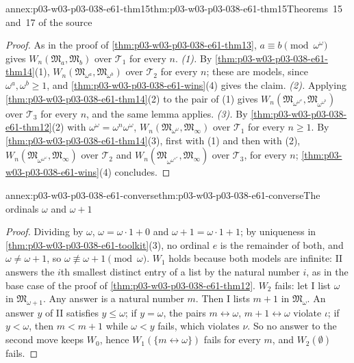 \begin{annexitem}{annex:p03-w03-p03-038-e61-thm15}{thm:p03-w03-p03-038-e61-thm15}{Theorems~15 and~17 of the source}
\begin{proof}
As in the proof of \cref{thm:p03-w03-p03-038-e61-thm13},
\(a\equiv b\pmod{\omega^\omega}\) gives
\(W_n(\mathfrak M_a,\mathfrak M_b)\) over \(\mathcal T_1\) for every
\(n\). \emph{(1).} By \cref{thm:p03-w03-p03-038-e61-thm14}(1),
\(W_n(\mathfrak M_{\omega^a},\mathfrak M_{\omega^b})\) over
\(\mathcal T_2\) for every \(n\); these are models, since
\(\omega^a,\omega^b\ge1\), and
\cref{thm:p03-w03-p03-038-e61-wins}(4) gives the claim. \emph{(2).}
Applying \cref{thm:p03-w03-p03-038-e61-thm14}(2) to the pair of (1) gives
\(W_n(\mathfrak M_{\omega^{\omega^a}},\mathfrak M_{\omega^{\omega^b}})\)
over \(\mathcal T_3\) for every \(n\), and the same lemma applies.
\emph{(3).} By \cref{thm:p03-w03-p03-038-e61-thm12}(2) with
\(\omega^\omega=\omega^n\omega^\omega\),
\(W_n(\mathfrak M_{\omega^\omega},\mathfrak M_\infty)\) over
\(\mathcal T_1\) for every \(n\ge1\). By
\cref{thm:p03-w03-p03-038-e61-thm14}(3), first with (1) and then with
(2), \(W_n(\mathfrak M_{\omega^{\omega^\omega}},\mathfrak M_\infty)\) over
\(\mathcal T_2\) and
\(W_n(\mathfrak M_{\omega^{\omega^{\omega^\omega}}},\mathfrak M_\infty)\)
over \(\mathcal T_3\), for every \(n\);
\cref{thm:p03-w03-p03-038-e61-wins}(4) concludes.
\end{proof}
\end{annexitem}

\begin{annexitem}{annex:p03-w03-p03-038-e61-converse}{thm:p03-w03-p03-038-e61-converse}{The ordinals \(\omega\) and \(\omega+1\)}
\begin{proof}
Dividing by \(\omega\), \(\omega=\omega\cdot1+0\) and
\(\omega+1=\omega\cdot1+1\); by uniqueness in
\cref{thm:p03-w03-p03-038-e61-toolkit}(3), no ordinal \(e\) is the
remainder of both, and \(\omega\ne\omega+1\), so
\(\omega\not\equiv\omega+1\pmod\omega\). \(W_1\) holds because both models
are infinite: II answers the \(i\)th smallest distinct entry of a list by
the natural number \(i\), as in the base case of the proof of
\cref{thm:p03-w03-p03-038-e61-thm12}. \(W_2\) fails: let I list
\(\omega\) in \(\mathfrak M_{\omega+1}\). Any answer is a natural number
\(m\). Then I lists \(m+1\) in \(\mathfrak M_\omega\). An answer \(y\) of
II satisfies \(y\le\omega\); if \(y=\omega\), the pairs
\(m\leftrightarrow\omega\), \(m+1\leftrightarrow\omega\) violate
\(\iota\); if \(y<\omega\), then \(m<m+1\) while \(\omega<y\) fails, which
violates \(\nu\). So no answer to the second move keeps \(W_0\), hence
\(W_1(\{m\leftrightarrow\omega\})\) fails for every \(m\), and
\(W_2(\emptyset)\) fails.
\end{proof}
\end{annexitem}

